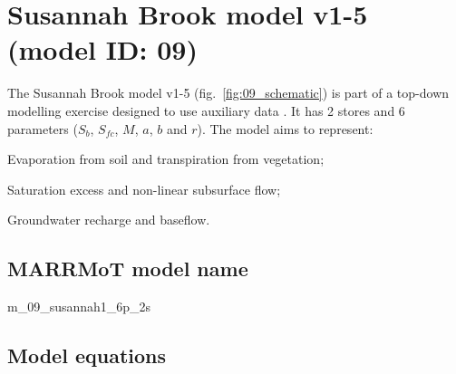 \section{ Susannah Brook model v1-5 (model ID: 09)}
The Susannah Brook model v1-5 (fig.~\ref{fig:09_schematic}) is part of a top-down modelling exercise designed to use auxiliary data \citep{Son2007}. It has 2 stores and 6 parameters ($S_b$, $S_{fc}$, $M$, $a$, $b$ and $r$). The model aims to represent:

\begin{itemizecompact}
\item Evaporation from soil and transpiration from vegetation;
\item Saturation excess and non-linear subsurface flow;
\item Groundwater recharge and baseflow.
\end{itemizecompact}

\subsection{MARRMoT model name}
m\_09\_susannah1\_6p\_2s \\

\subsection{Model equations}

